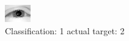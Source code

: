 \begin{figure}[h!]
\begin{center}
\includegraphics[width=0.60\columnwidth]{figures/ID2354_class_1_target_2.png}
\end{center}
\caption{ Classification: 1 actual target: 2}
\label{fig:ID2354_class_1_target_2}
\end{figure}
